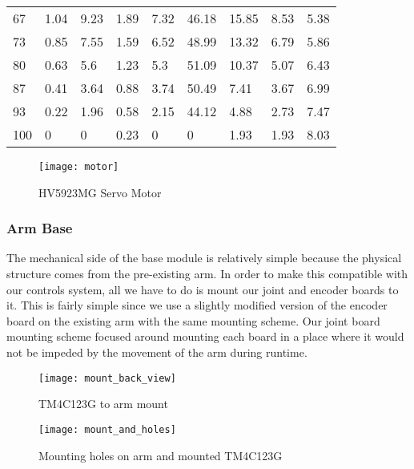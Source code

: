 \begin{table} [H]
\begin{tabular}{|p{1cm}|p{1.2cm}|p{1.4cm}|p{1cm}|p{1cm}|p{1.5cm}|p{1cm}|p{1cm}|p{1.1cm}|}
		67 & 1.04 & 9.23 & 1.89 & 7.32 & 46.18 & 15.85 & 8.53 & 5.38 \\
		
		73 & 0.85 & 7.55 & 1.59 & 6.52 & 48.99 & 13.32 & 6.79 & 5.86 \\
		
		80 & 0.63 & 5.6 & 1.23 & 5.3 & 51.09 & 10.37 & 5.07 & 6.43 \\
		
		87 & 0.41 & 3.64 & 0.88 & 3.74 & 50.49 & 7.41 & 3.67 & 6.99 \\
		
		93 & 0.22 & 1.96 & 0.58 & 2.15 & 44.12 & 4.88 & 2.73 & 7.47 \\
		
		100 & 0 & 0 & 0.23 & 0 & 0 & 1.93 & 1.93 & 8.03 \\
		\hline
		
	\end{tabular}
	
\end{table}

\begin{figure}[H]
	\centering
	\texttt{[image: motor]}
	\caption{HV5923MG Servo Motor}
	\label{fig:HV5923MG Servo Motor}
\end{figure}


\subsubsection{Arm Base}
The mechanical side of the base module is relatively simple because the physical structure comes from the pre-existing arm. In order to make this compatible with our controls system, all we have to do is mount our joint and encoder boards to it. This is fairly simple since we use a slightly modified version of the encoder board on the existing arm with the same mounting scheme. Our joint board mounting scheme focused around mounting each board in a place where it would not be impeded by the movement of the arm during runtime. 

\begin{figure}[H]
	\centering
	\texttt{[image: mount\_back\_view]}
	\caption{TM4C123G to arm mount}
	\label{fig:mount_back_view}
\end{figure}

\begin{figure}[H]
	\centering
	\texttt{[image: mount\_and\_holes]}
	\caption{Mounting holes on arm and mounted TM4C123G}
	\label{fig:mount_and_holes}
\end{figure}

